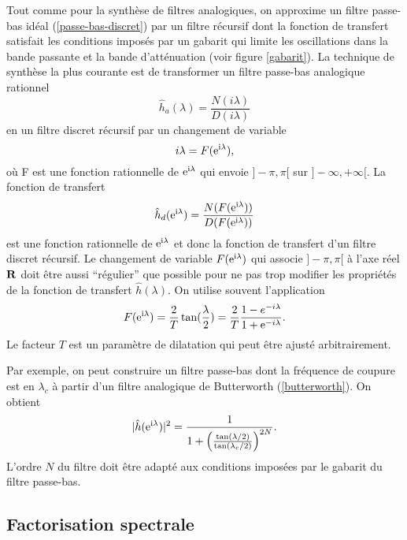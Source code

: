 Tout comme pour la synth\`ese de filtres analogiques, on
approxime un filtre passe-bas id\'eal (\ref{passe-bas-discret})
par un filtre r\'ecursif dont la fonction de transfert satisfait
les conditions impos\'es par un
gabarit qui limite les oscillations dans
la bande passante et la bande d'att\'enuation
(voir figure \ref{gabarit}).
La technique de synth\`ese la plus courante
est de transformer un filtre passe-bas analogique rationnel
\[
\hat h_a (\lambda) = \frac {N(i\lambda)} {D(i \lambda)}
\]
en un filtre discret r\'ecursif par un changement de variable
\[
i\lambda = F({\mathrm{e}^{\mathrm{i} \lambda}}) ,
\]
o\`u F est une fonction rationnelle de ${\mathrm{e}^{\mathrm{i} \lambda}}$ qui envoie
$]-\pi,\pi[$ sur
$]-\infty,+\infty[$.
La fonction de transfert
\[
\hat h_d ({\mathrm{e}^{\mathrm{i} \lambda}}) = \frac {N(F({\mathrm{e}^{\mathrm{i} \lambda}}))} {D(F({\mathrm{e}^{\mathrm{i} \lambda}}))}
\]
est une fonction rationnelle de ${\mathrm{e}^{\mathrm{i} \lambda}}$
et donc la fonction de transfert
d'un filtre discret r\'ecursif.
Le changement de variable $F({\mathrm{e}^{\mathrm{i} \lambda}})$ qui associe
$]-\pi,\pi[$ \`a l'axe r\'eel ${\bf{R}}$ doit \^etre aussi ``r\'egulier''
que possible pour ne pas trop modifier les propri\'et\'es
de la fonction de transfert $\hat h(\lambda)$.
On utilise souvent l'application
\[
F({\mathrm{e}^{\mathrm{i} \lambda}}) = \frac 2 T \tan (\frac {\lambda} 2 ) =
\frac {2} T \frac{1 - e^{-i\lambda}}{1 + \mathrm{e}^{-i\lambda}} .
\]
Le facteur $T$ est un param\`etre de dilatation qui peut \^etre
ajust\'e arbitrairement.

Par exemple,
on peut construire un filtre passe-bas dont la fr\'equence
de coupure est en $\lambda_c$ \`a partir d'un filtre analogique de
Butterworth (\ref{butterworth}).
On obtient
\[
|\hat h({\mathrm{e}^{\mathrm{i} \lambda}})|^2 = \frac 1 {1 + \left(
\frac {\tan (\lambda/2)} {\tan (\lambda_c /2)}\right)^{2N}} .
\]
L'ordre $N$ du filtre doit \^etre adapt\'e aux conditions
impos\'ees
par le gabarit du filtre passe-bas.

\subsection{Factorisation spectrale}

